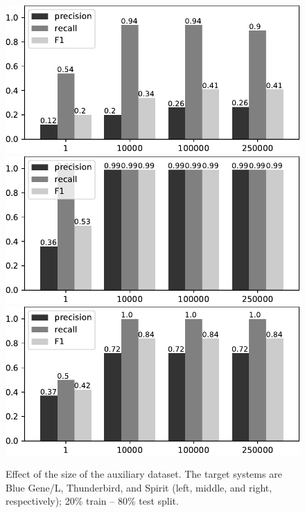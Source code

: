 \begin{figure}[!t]
  \includegraphics[width=\linewidth]{gfx/chap4/auxiliaryeffects.pdf}
\endminipage\hfill
{}
  \includegraphics[width=\linewidth]{gfx/chap4/auxiliaryeffects_tbird.pdf}
\endminipage\hfill
{}
  \includegraphics[width=\linewidth]{gfx/chap4/auxiliaryeffects_spirit.pdf}
\endminipage
\caption{Effect of the size of the auxiliary dataset. The target systems are Blue Gene/L, Thunderbird, and Spirit (left, middle, and right, respectively); 20\% train -- 80\% test split.}
\label{fig:auxiliary}
\end{figure}

